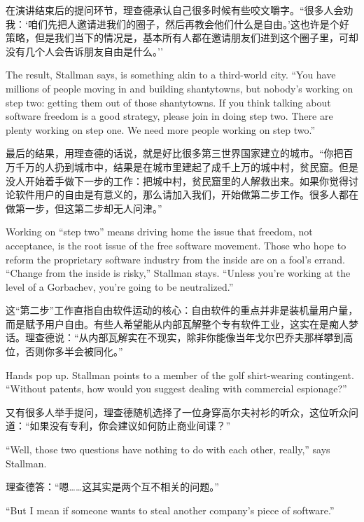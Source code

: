 \ifdefined\chs
在演讲结束后的提问环节，理查德承认自己很多时候有些咬文嚼字。``很多人会劝我：`咱们先把人邀请进我们的圈子，然后再教会他们什么是自由。'这也许是个好策略，但是我们当下的情况是，基本所有人都在邀请朋友们进到这个圈子里，可却没有几个人会告诉朋友自由是什么。''
\fi

\ifdefined\eng
The result, Stallman says, is something akin to a third-world city. ``You have millions of people moving in and building shantytowns, but nobody's working on step two: getting them out of those shantytowns. If you think talking about software freedom is a good strategy, please join in doing step two. There are plenty working on step one. We need more people working on step two.''
\fi

\ifdefined\chs
最后的结果，用理查德的话说，就是好比很多第三世界国家建立的城市。``你把百万千万的人扔到城市中，结果是在城市里建起了成千上万的城中村，贫民窟。但是没人开始着手做下一步的工作：把城中村，贫民窟里的人解救出来。如果你觉得讨论软件用户的自由是有意义的，那么请加入我们，开始做第二步工作。很多人都在做第一步，但这第二步却无人问津。''
\fi

\ifdefined\eng
Working on ``step two'' means driving home the issue that freedom, not acceptance, is the root issue of the free software movement. Those who hope to reform the proprietary software industry from the inside are on a fool's errand. ``Change from the inside is risky,'' Stallman stays. ``Unless you're working at the level of a Gorbachev, you're going to be neutralized.''
\fi

\ifdefined\chs
这``第二步''工作直指自由软件运动的核心：自由软件的重点并非是装机量用户量，而是赋予用户自由。有些人希望能从内部瓦解整个专有软件工业，这实在是痴人梦话。理查德说：``从内部瓦解实在不现实，除非你能像当年戈尔巴乔夫那样攀到高位，否则你多半会被同化。''
\fi

\ifdefined\eng
Hands pop up. Stallman points to a member of the golf shirt-wearing contingent. ``Without patents, how would you suggest dealing with commercial espionage?''
\fi

\ifdefined\chs
又有很多人举手提问，理查德随机选择了一位身穿高尔夫衬衫的听众，这位听众问道：``如果没有专利，你会建议如何防止商业间谍？''
\fi

\ifdefined\eng
``Well, those two questions have nothing to do with each other, really,'' says Stallman.
\fi

\ifdefined\chs
理查德答：``嗯……这其实是两个互不相关的问题。''
\fi

\ifdefined\eng
``But I mean if someone wants to steal another company's piece of software.''
\fi

